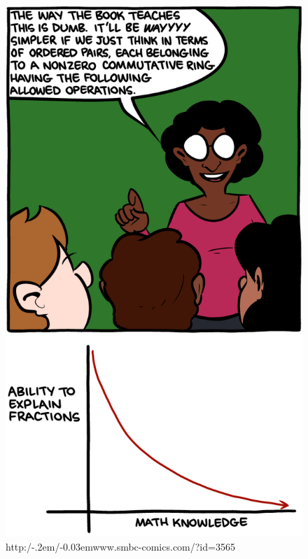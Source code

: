 \documentclass[entwurf]{uebblatt}
\newcommand{\http}{http:/\kern-.2em/\kern-0.03em}
\begin{document}
\setlength{\wrapoverhang}{1.4cm}
\setlength{\columnsep}{0.8cm}
\begin{figure}
  \vspace{-2em}
  \href{http://www.smbc-comics.com/?id=3565}{\includegraphics[scale=0.25]{images/smbc-fractions}}
  \tiny\sffamily \http www.smbc-comics.com/?id=3565
\end{figure}
\end{document}

